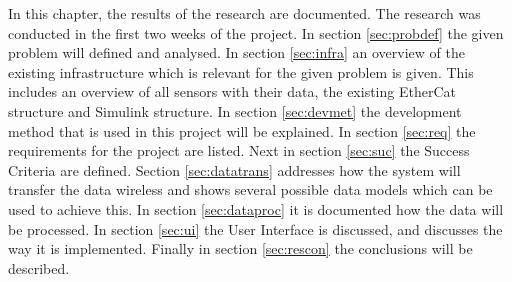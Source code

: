In this chapter, the results of the research are documented. The research was conducted in the first two weeks of the project. In section \ref{sec:probdef} the given problem will defined and analysed. In section \ref{sec:infra} an overview of the existing infrastructure which is relevant for the given problem is given. This includes an overview of all sensors with their data, the existing EtherCat structure and Simulink structure. In section \ref{sec:devmet} the development method that is used in this project will be explained. In section \ref{sec:req} the requirements for the project are listed. Next in section \ref{sec:suc} the Success Criteria are defined. Section \ref{sec:datatrans} addresses how the system will transfer the data wireless and shows several possible data models which can be used to achieve this. In section \ref{sec:dataproc} it is documented how the data will be processed. In section \ref{sec:ui} the User Interface is discussed, and discusses the way it is implemented. Finally in section \ref{sec:rescon} the conclusions will be described.